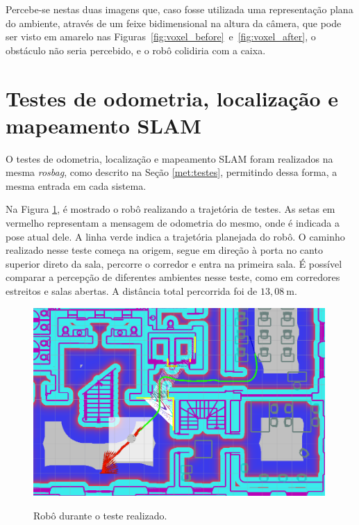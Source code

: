 \documentclass[repeatfields,xlists,xpacks,oneside,yearsonly]{ufrgscca}
\begin{document}
Percebe-se nestas duas imagens que, caso fosse utilizada uma
representação plana do ambiente, através de um feixe bidimensional na
altura da câmera, que pode ser visto em amarelo nas
Figuras~\ref{fig:voxel_before}~e~\ref{fig:voxel_after}, o obstáculo
não seria percebido, e o robô colidiria com a caixa.

\section{Testes de odometria, localização e mapeamento SLAM}

O testes de odometria, localização e mapeamento SLAM foram realizados
na mesma \textit{rosbag}, como descrito na Seção \ref{met:testes},
permitindo dessa forma, a mesma entrada em cada sistema.

Na Figura \ref{fig:base_bag}, é mostrado o robô realizando a
trajetória de testes. As setas em vermelho representam a mensagem de
odometria do mesmo, onde é indicada a pose atual dele. A linha verde
indica a trajetória planejada do robô. O caminho realizado nesse
teste começa na origem, segue em direção à porta no canto superior
direto da sala, percorre o corredor e entra na primeira sala. É
possível comparar a percepção de diferentes ambientes nesse teste,
como em corredores estreitos e salas abertas. A distância total
percorrida foi de $13,08~\si{\meter}$.

\begin{figure}[h]
    {
        \centering
        \caption{Robô durante o teste realizado.}
        \label{fig:base_bag}
        \includegraphics[width=0.99\textwidth]{base_bag_sim_zoom.png}\\
    }
\end{figure}
\end{document}
